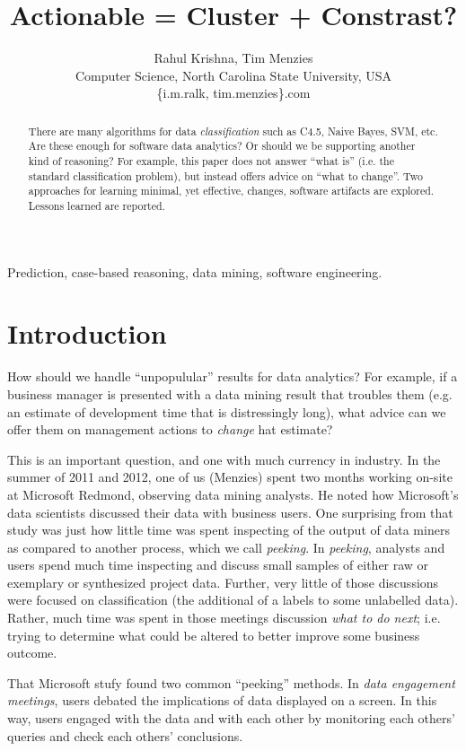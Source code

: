 \documentclass[conference]{IEEEtran}
\title{Actionable = Cluster + Constrast?}
\author{Rahul Krishna, Tim Menzies\\
        Computer Science, North Carolina State University, USA\\
       \{i.m.ralk, tim.menzies\}\@gmail.com
       
}
\begin{document}
  \maketitle
    \begin{abstract}
 There are many
    algorithms for data {\em classification} such as  C4.5, Naive Bayes, SVM, etc.
    Are these enough for software data analytics? Or should we be supporting
    another kind of reasoning? For example, this paper does not answer 
    ``what is'' (i.e. the standard classification problem), but instead  offers advice on ``what to change''.
Two approaches for learning minimal, yet effective,  changes,  software
artifacts are explored. Lessons learned are reported.
  \end{abstract}
  \begin{IEEEkeywords}
Prediction, case-based reasoning, data mining, software engineering.
  \end{IEEEkeywords}

\section{Introduction} 
How should we handle ``unpopulular'' results
    for data analytics? For example, if a business manager is presented
    with a data mining result that troubles them (e.g. an estimate of
    development time that is distressingly long), what advice
    can we offer them on management actions to {\em change} hat estimate?

This is an important question, and one with much currency in industry.
In the summer of 2011 and 2012, one of us (Menzies) spent two months
working on-site at Microsoft Redmond,
observing data mining analysts.  He
noted how Microsoft's data scientists
discussed their data with  business users. 
One surprising from that study was just how
little time was spent  
inspecting  of the output of data miners as compared to another process, which we call {\em peeking}.
In {\em peeking}, analysts and users spend much time
inspecting and discuss small samples of either raw or exemplary or synthesized project data.  Further, very little of those discussions were  focused on classification
(the additional of a labels to some unlabelled data). Rather, much time
was spent in those meetings discussion {\em what to do next}; i.e. trying
to determine what could be altered to better improve some business outcome.

That   Microsoft  stufy found two common ``peeking'' methods.
In {\em data engagement meetings},
users debated the implications of data
displayed on a screen. In this way, users
engaged with the data and with each other by
monitoring each others' queries and check each others'
conclusions.
\end{document}
